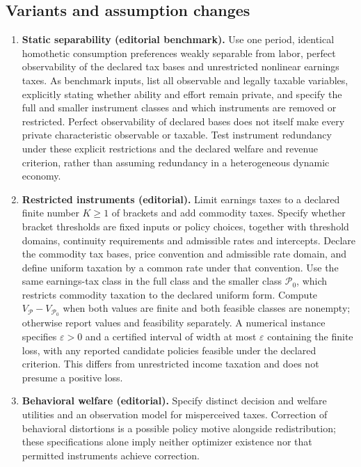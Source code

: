 \documentclass[11pt,a4paper]{article}
\begin{document}
\subsection*{Variants and assumption changes}
\begin{enumerate}
\item \textbf{Static separability (editorial benchmark).} Use one period, identical homothetic consumption preferences weakly separable from labor, perfect observability of the declared tax bases and unrestricted nonlinear earnings taxes. As benchmark inputs, list all observable and legally taxable variables, explicitly stating whether ability and effort remain private, and specify the full and smaller instrument classes and which instruments are removed or restricted. Perfect observability of declared bases does not itself make every private characteristic observable or taxable. Test instrument redundancy under these explicit restrictions and the declared welfare and revenue criterion, rather than assuming redundancy in a heterogeneous dynamic economy.
\item \textbf{Restricted instruments (editorial).} Limit earnings taxes to a declared finite number \(K\geq1\) of brackets and add commodity taxes. Specify whether bracket thresholds are fixed inputs or policy choices, together with threshold domains, continuity requirements and admissible rates and intercepts. Declare the commodity tax bases, price convention and admissible rate domain, and define uniform taxation by a common rate under that convention. Use the same earnings-tax class in the full class and the smaller class \(\mathcal P_0\), which restricts commodity taxation to the declared uniform form. Compute \(V_{\mathcal P}-V_{\mathcal P_0}\) when both values are finite and both feasible classes are nonempty; otherwise report values and feasibility separately. A numerical instance specifies \(\varepsilon>0\) and a certified interval of width at most \(\varepsilon\) containing the finite loss, with any reported candidate policies feasible under the declared criterion. This differs from unrestricted income taxation and does not presume a positive loss.
\item \textbf{Behavioral welfare (editorial).} Specify distinct decision and welfare utilities and an observation model for misperceived taxes. Correction of behavioral distortions is a possible policy motive alongside redistribution; these specifications alone imply neither optimizer existence nor that permitted instruments achieve correction.
\end{enumerate}
\end{document}
